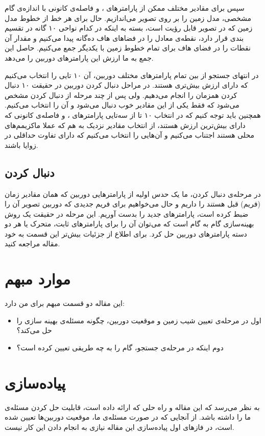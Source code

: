 \documentclass{report}
\begin{document}
سپس برای مقادیر مختلف ممکن از پارامترهای ،  و فاصله‌ی کانونی با اندازه‌ی گام مشخصی، مدل زمین را بر روی تصویر می‌اندازیم. حال برای هر خط از خطوط مدل زمین که در تصویر قابل رؤیت است، بسته به اینکه در کدام نواحی ۱۰ گانه در تقسیم بندی قرار دارد، نقطه‌ی معادل را در فضاهای هاف ده‌گانه پیدا می‌کنیم و مقدار آن نقطات را در فضای هاف برای تمام خطوط زمین با یکدیگر جمع می‌کنیم. حاصل این جمع به ما ارزش این پارامترهای دوربین را می‌دهد.

در انتهای جستجو از بین تمام پارامترهای مختلف دوربین، آن ۱۰ تایی را انتخاب می‌کنیم که دارای ارزش بیش‌تری هستند. در مراحل دنبال کردن دوربین در حقیقت ۱۰ دنبال کردن همزمان را انجام می‌دهیم. ولی پس از چند مرحله از دنبال کردن مشخص می‌شود که فقط یکی از این مقادیر خوب دنبال می‌شود و آن را انتخاب می‌کنیم. همچنین باید توجه کنیم که در انتخاب ۱۰ تا از سه‌تایی پارامترهای ،  و فاصله‌ی کانونی که دارای بیش‌ترین ارزش هستند، از انتخاب مقادیر نزدیک به هم که عملا ماکزیمم‌های محلی هستند اجتناب می‌کنیم و آن‌هایی را انتخاب می‌کنیم که دارای تفاوت حداقلی در زوایا باشند.
\subsection{دنبال کردن}
در مرحله‌ی دنبال کردن، ما یک حدس اولیه از پارامترهایی دوربین که همان مقادیر زمان (فریم) قبل هستند را داریم و حال می‌خواهیم برای فریم جدیدی که دوربین تصویر آن را ضبط کرده است، پارامترهای جدید را بدست آوریم. این مرحله در حقیقت یک روش بهینه‌سازی گام به گام  است که می‌توان آن را برای پارامترهای ثابت، متحرک یا هر دو دسته پارامترهای دوربین حل کرد. برای اطلاع از جزئیات بیش‌تر این قسمت به خود مقاله مراجعه کنید.
\section{موارد مبهم}
این مقاله دو قسمت مبهم برای من دارد:
\begin{itemize}
\item
اول در مرحله‌ی تعیین شیب زمین و موقعیت دوربین، چگونه مسئله‌ی بهینه سازی را حل می‌کند؟
\item
دوم اینکه در مرحله‌ی جستجو، گام را به چه طریقی تعیین کرده است؟
\end{itemize}
\section{پیاده‌سازی}
به نظر می‌رسد که این مقاله و راه حلی که ارائه داده است، قابلیت حل کردن مسئله‌ی ما را داشته باشد. از آنجایی که در صورت مسئله‌ی ما، موقعیت دوربین‌ها تعیین شده است، در فازهای اول پیاده‌سازی این مقاله نیازی به انجام دادن این کار نیست.
\end{document}
